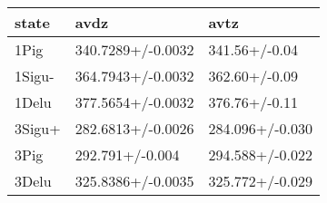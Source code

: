 \begin{tabular}{lll}
\toprule
state & avdz & avtz \\
\midrule
1Pig & 340.7289+/-0.0032 & 341.56+/-0.04 \\
1Sigu- & 364.7943+/-0.0032 & 362.60+/-0.09 \\
1Delu & 377.5654+/-0.0032 & 376.76+/-0.11 \\
3Sigu+ & 282.6813+/-0.0026 & 284.096+/-0.030 \\
3Pig & 292.791+/-0.004 & 294.588+/-0.022 \\
3Delu & 325.8386+/-0.0035 & 325.772+/-0.029 \\
\bottomrule
\end{tabular}
